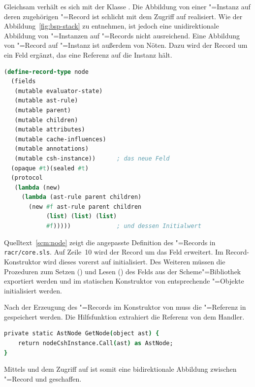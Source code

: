 Gleichsam verhält es sich mit der Klasse . Die Abbildung von einer "=Instanz auf deren zugehörigen "=Record ist schlicht mit dem Zugriff auf  realisiert. Wie der Abbildung~\ref{fig:bsp-stack} zu entnehmen, ist jedoch eine unidirektionale Abbildung von "=Instanzen auf "=Records nicht ausreichend. Eine Abbildung von "=Record auf "=Instanz ist außerdem von Nöten. Dazu wird der Record um ein Feld ergänzt, das eine Referenz auf die Instanz hält.

\begin{lstlisting}[language=scm, caption={Angepasste Definition des \csh{node}"=Records}, label=scm:node]
(define-record-type node
  (fields
   (mutable evaluator-state)
   (mutable ast-rule)
   (mutable parent)
   (mutable children)
   (mutable attributes)
   (mutable cache-influences)
   (mutable annotations)
   (mutable csh-instance))      ; das neue Feld
  (opaque #t)(sealed #t)
  (protocol
   (lambda (new)
     (lambda (ast-rule parent children)
       (new #f ast-rule parent children
            (list) (list) (list)
            #f)))))             ; und dessen Initialwert
\end{lstlisting}

Quelltext~\ref{scm:node} zeigt die angepasste Definition des "=Records in \verb|racr/core.sls|. Auf Zeile~10 wird der Record um das Feld  erweitert. Im Record-Konstruktor wird dieses vorerst auf  initialisiert. Des Weiteren müssen die Prozeduren zum Setzen () und Lesen () des Felds aus der Scheme"=Bibliothek exportiert werden und im statischen Konstruktor von  entsprechende "=Objekte initialisiert werden.

Nach der Erzeugung des "=Records im Konstruktor von  muss die "=Referenz in  gespeichert werden. Die Hilfsfunktion  extrahiert die Referenz von dem Handler.

\begin{lstlisting}[language=csh]
private static AstNode GetNode(object ast) {
	return nodeCshInstance.Call(ast) as AstNode;
}
\end{lstlisting}

Mittels  und dem Zugriff auf  ist somit eine bidirektionale Abbildung zwischen "=Record und  geschaffen.

